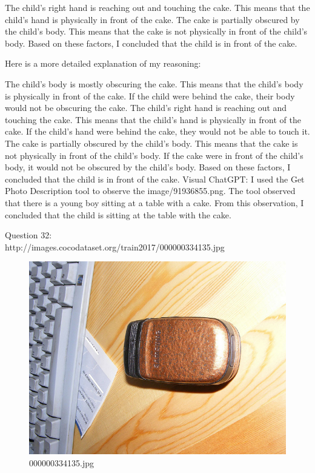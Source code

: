 \begin{enumerate}
        The child's right hand is reaching out and touching the cake. This means that the child's hand is physically in front of the cake.
        The cake is partially obscured by the child's body. This means that the cake is not physically in front of the child's body.
        Based on these factors, I concluded that the child is in front of the cake.

        Here is a more detailed explanation of my reasoning:

        The child's body is mostly obscuring the cake. This means that the child's body is physically in front of the cake. If the child were behind the cake, their body would not be obscuring the cake.
        The child's right hand is reaching out and touching the cake. This means that the child's hand is physically in front of the cake. If the child's hand were behind the cake, they would not be able to touch it.
        The cake is partially obscured by the child's body. This means that the cake is not physically in front of the child's body. If the cake were in front of the child's body, it would not be obscured by the child's body.
        Based on these factors, I concluded that the child is in front of the cake.
        \subitem Visual ChatGPT: I used the Get Photo Description tool to observe the image/91936855.png. The tool observed that there is a young boy sitting at a table with a cake. From this observation, I concluded that the child is sitting at the table with the cake.
    \end{enumerate}
    Question 32:\\http://images.cocodataset.org/train2017/000000334135.jpg
    \begin{figure}[h]
        \centering
        \includegraphics[width=0.8\linewidth]{../image set/easy/000000334135.jpg}
        \caption{000000334135.jpg}
    \end{figure}
